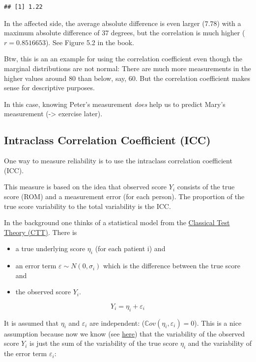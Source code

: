 \documentclass[
]{book}
\providecommand{\tightlist}{%
  \setlength{\itemsep}{0pt}\setlength{\parskip}{0pt}}
\begin{document}
\begin{verbatim}
## [1] 1.22
\end{verbatim}

In the affected side, the average absolute difference is even larger (\(7.78\))
with a maximum absolute difference of 37 degrees,
but the correlation is much higher (\(r=0.8516653\)). See Figure 5.2 in the book.

Btw, this is an an example for using the correlation coefficient even though
the marginal distributions are not normal: There are much more measurements in the higher
values around 80 than below, say, 60. But the correlation coefficient makes sense
for descriptive purposes.

In this case, knowing Peter's measurement \emph{does} help us to predict
Mary's measurement (-\textgreater{} exercise later).

\subsection{Intraclass Correlation Coefficient (ICC)}\label{intraclass-correlation-coefficient-icc}

One way to measure reliability is to use the intraclass correlation coefficient (ICC).

This measure is based on the idea that observed score \(Y_i\) consists of the true score
(ROM) and a measurement error (for each person).
The proportion of the true score variability to the total variability is the ICC.

In the background one thinks of a statistical model from the
\href{https://en.wikipedia.org/wiki/Classical_test_theory}{Classical Test Theory (CTT)}.
There is

\begin{itemize}
\tightlist
\item
  a true underlying score \(\eta_i\) (for each patient i) and
\item
  an error term \(\varepsilon \sim N(0, \sigma_i)\) which is the difference between the true
  score and
\item
  the observed score \(Y_i\).
\end{itemize}

\[ Y_i = \eta_i + \varepsilon_i \]

It is assumed that \(\eta_i\) and \(\varepsilon_i\) are independent: (\(\mathbb{C}ov(\eta_i, \varepsilon_i)=0\)).
This is a nice assumption because now we know (see \href{https://en.wikipedia.org/wiki/Variance\#Addition_and_multiplication_by_a_constant}{here})
that the variability
of the observed score \(Y_i\) is just the sum of the variability of the true score \(\eta_i\)
and the variability of the error term \(\varepsilon_i\):
\end{document}
